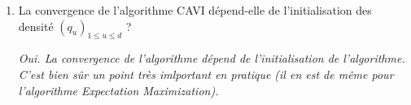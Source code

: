 \documentclass[a4paper,10pt,fleqn]{article}
\newcommand{\1}{\ensuremath{\mathbbm{1}}}
\begin{document}
\begin{enumerate}
\vspace{.2cm}

{\em
Il suffit d'\'ecrire, pour $1\leq j\leq d$, la fonction $z_j \mapsto \exp\{\mathbb{E}_{-j}[\log p (z_{j},Z_{-j},X)]\}$ en utilisant la forme exponentielle de l'\'enonc\'e et de supprimer les termes multiplicatifs ne d\'ependants pas de $z_j$.
}
\item La convergence de l'algorithme CAVI  d\'epend-elle de l'initialisation des densit\'e $(q_u)_{1\leqslant u\leqslant d}$ ?

\vspace{.2cm}

{\em
Oui. La convergence de l'algorithme d\'epend de l'initialisation de l'algorithme. C'est bien s\^ur un point tr\`es imlportant en pratique (il en est de m\^eme pour l'algorithme Expectation Maximization).
}
\end{enumerate}
\end{document}
